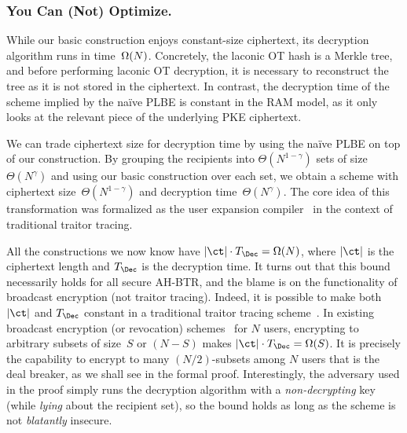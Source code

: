 \subsubsection{You Can (Not) Optimize.}
While our basic construction enjoys constant-size ciphertext,
its decryption algorithm runs in time~$\operatorname{\Omega}(N)$.
Concretely, the laconic OT hash is a Merkle tree, and before performing laconic OT decryption, it is necessary to reconstruct the tree as it is not stored in the ciphertext.
In contrast, the decryption time of the scheme implied by the na{\"i}ve PLBE is constant in the RAM model, as it only looks at the relevant piece of the underlying PKE ciphertext.

We can trade ciphertext size for decryption time by using the na{\"i}ve PLBE on top of our construction.
By grouping the recipients into $\Theta(N^{1-\gamma})$ sets of size~$\Theta(N^\gamma)$ and using our basic construction over each set, we obtain a scheme with ciphertext size~$\Theta(N^{1-\gamma})$ and decryption time~$\Theta(N^\gamma)$.
The core idea of this transformation was formalized as the user expansion compiler~\cite{C:Zhandry20} in the context of traditional traitor tracing.

All the constructions we now know have ${|\ct|\cdot T_\Dec=\bigOmega(N)}$,
where $|\ct|$ is the ciphertext length and $T_\Dec$ is the decryption time.
It turns out that this bound necessarily holds for all secure AH-BTR, and
the blame is on the functionality of broadcast encryption (not traitor tracing).
Indeed, 
it is possible to make both $|\ct|$ and $T_\Dec$ constant in a traditional traitor tracing scheme~\cite{C:BonZha14}.
In existing broadcast encryption (or revocation) schemes~\cite{C:BonGenWat05,AC:Delerablee07,EC:GenWat09,C:BonZha14,EC:AgrYam20,TCC:AgrWicYam20,EPRINT:BraVai20} for $N$ users,
encrypting to arbitrary subsets of size~$S$ or $({N-S})$ makes ${|\ct|\cdot T_\Dec=\Omega(S)}$.
It is precisely the capability to encrypt to many ${(N/2)}$-subsets among $N$ users that is the deal breaker, as we shall see in the formal proof.
Interestingly,
the adversary used in the proof
simply runs the decryption algorithm with a \emph{non-decrypting} key
(while \emph{lying} about the recipient set),
so the bound holds as long as the scheme is not \emph{blatantly} insecure.

